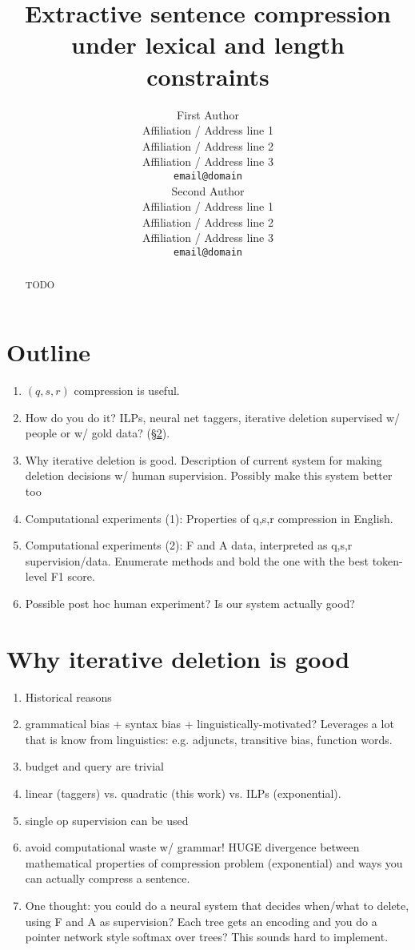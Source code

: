 \documentclass[11pt,a4paper]{article}
\title{Extractive sentence compression under lexical and length constraints}
\author{First Author \\
  Affiliation / Address line 1 \\
  Affiliation / Address line 2 \\
  Affiliation / Address line 3 \\
  {\tt email@domain} \\\And
  Second Author \\
  Affiliation / Address line 1 \\
  Affiliation / Address line 2 \\
  Affiliation / Address line 3 \\
  {\tt email@domain} \\}
\date{}
\begin{document}
\maketitle

\begin{abstract}
TODO
\end{abstract}

\section{Outline}

\begin{enumerate}
\item{$(q,s,r)$ compression is useful.}
\item{How do you do it? ILPs, neural net taggers, iterative deletion supervised w/ people or w/ gold data? (\S\ref{s:method}).}
\item{Why iterative deletion is good. Description of current system for making deletion decisions w/ human supervision. Possibly make this system better too}
\item{Computational experiments (1): Properties of q,s,r compression in English. }
\item{Computational experiments (2): F and A data, interpreted as q,s,r supervision/data. Enumerate methods and bold the one with the best token-level F1 score.}
\item{Possible post hoc human experiment? Is our system actually good?}
\end{enumerate}




\section{Why iterative deletion is good}\label{s:method}
\begin{enumerate}
\item{Historical reasons}
\item{grammatical bias + syntax bias + linguistically-motivated? Leverages a lot that is know from linguistics: e.g. adjuncts, transitive bias, function words.}
\item{budget and query are trivial}
\item{linear (taggers) vs. quadratic (this work) vs. ILPs (exponential). }
\item{single op supervision can be used}
\item{avoid computational waste w/ grammar! HUGE divergence between mathematical properties of compression problem (exponential) and ways you can actually compress a sentence.}
\item{One thought: you could do a neural system that decides when/what to delete, using F and A as supervision? Each tree gets an encoding and you do a pointer network style softmax over trees? This sounds hard to implement.}
\end{enumerate}
\end{document}
